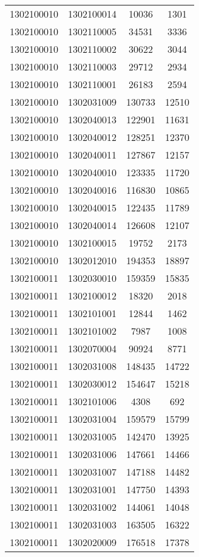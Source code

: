\begin{longtable}[h]{llcc}
		1302100010 & 1302100014 & 10036 & 1301\\
		1302100010 & 1302110005 & 34531 & 3336\\
		1302100010 & 1302110002 & 30622 & 3044\\
		1302100010 & 1302110003 & 29712 & 2934\\
		1302100010 & 1302110001 & 26183 & 2594\\
		1302100010 & 1302031009 & 130733 & 12510\\
		1302100010 & 1302040013 & 122901 & 11631\\
		1302100010 & 1302040012 & 128251 & 12370\\
		1302100010 & 1302040011 & 127867 & 12157\\
		1302100010 & 1302040010 & 123335 & 11720\\
		1302100010 & 1302040016 & 116830 & 10865\\
		1302100010 & 1302040015 & 122435 & 11789\\
		1302100010 & 1302040014 & 126608 & 12107\\
		1302100010 & 1302100015 & 19752 & 2173\\
		1302100010 & 1302012010 & 194353 & 18897\\
		1302100011 & 1302030010 & 159359 & 15835\\
		1302100011 & 1302100012 & 18320 & 2018\\
		1302100011 & 1302101001 & 12844 & 1462\\
		1302100011 & 1302101002 & 7987 & 1008\\
		1302100011 & 1302070004 & 90924 & 8771\\
		1302100011 & 1302031008 & 148435 & 14722\\
		1302100011 & 1302030012 & 154647 & 15218\\
		1302100011 & 1302101006 & 4308 & 692\\
		1302100011 & 1302031004 & 159579 & 15799\\
		1302100011 & 1302031005 & 142470 & 13925\\
		1302100011 & 1302031006 & 147661 & 14466\\
		1302100011 & 1302031007 & 147188 & 14482\\
		1302100011 & 1302031001 & 147750 & 14393\\
		1302100011 & 1302031002 & 144061 & 14048\\
		1302100011 & 1302031003 & 163505 & 16322\\
		1302100011 & 1302020009 & 176518 & 17378\\

\end{longtable}
